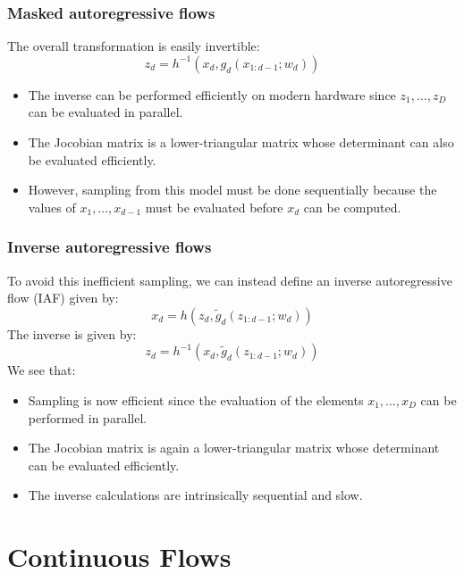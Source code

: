 \documentclass{beamer}
\begin{document}
\begin{frame}
    \frametitle{Masked autoregressive flows}
    The overall transformation is easily invertible:
    \begin{equation*}
        z_{d}=h^{-1}(x_{d},g_{d}(x_{1:d-1};w_{d}))
    \end{equation*}
    \begin{itemize}
        \item The inverse can be performed efficiently on modern hardware since $z_{1},\hdots,z_{D}$ can be evaluated in parallel.
        \item The Jocobian matrix is a lower-triangular matrix whose determinant can also be evaluated efficiently.
        \item However, sampling from this model must be done sequentially because the values of $x_{1},\hdots,x_{d-1}$ must be evaluated before $x_{d}$ can be computed.
    \end{itemize}
\end{frame}

\begin{frame}
    \frametitle{Inverse autoregressive flows}
    To avoid this inefficient sampling, we can instead define an inverse autoregressive flow (IAF) given by:
    \begin{equation*}
        x_{d}=h(z_{d},\tilde{g}_{d}(z_{1:d-1};w_d))
    \end{equation*}
    The inverse is given by:
    \begin{equation*}
        z_{d}=h^{-1}(x_{d},\tilde{g}_{d}(z_{1:d-1};w_d))
    \end{equation*}
    We see that:
    \begin{itemize}
        \item Sampling is now efficient since the evaluation of the elements $x_{1},\hdots,x_{D}$ can be performed in parallel.
        \item The Jocobian matrix is again a lower-triangular matrix whose determinant can be evaluated efficiently.
        \item The inverse calculations are intrinsically sequential and slow.
    \end{itemize}
\end{frame}

\section{Continuous Flows}
\end{document}
